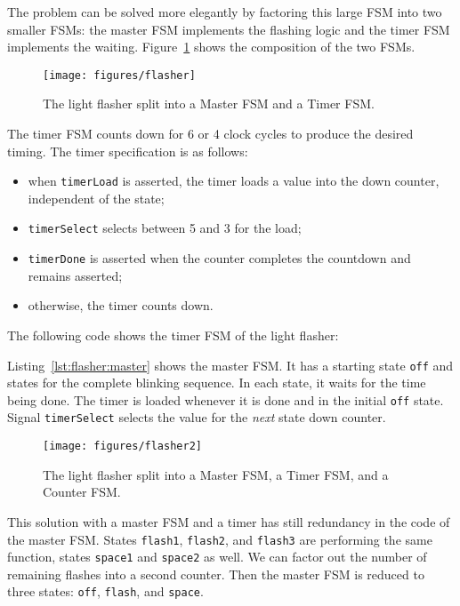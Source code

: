 \documentclass[%
    10pt,
    headinclude, footexclude,
    openright, %
    notitlepage,
    cleardoubleempty,
    headsepline,
    pointlessnumbers,
    bibtotoc, idxtotoc,
    ]{scrbook}
\newcommand{\scale}{0.7}
\newcommand{\code}[1]{{\lstinline[basicstyle=\small\ttfamily]{#1}}}
\begin{document}
The problem can be solved more elegantly by factoring this large FSM into
two smaller FSMs: the master FSM implements the flashing logic and the timer FSM
implements the waiting. Figure~\ref{fig:flasher} shows the composition of
the two FSMs.

\begin{figure}
  \centering
  \texttt{[image: figures/flasher]}
  \caption{The light flasher split into a Master FSM and a Timer FSM.}
  \label{fig:flasher}
\end{figure}

The timer FSM counts down for 6 or 4 clock cycles to produce the desired timing.
The timer specification is as follows:

\begin{itemize}
\item when \code{timerLoad} is asserted, the timer loads a value into the down counter,
independent of the state;
\item \code{timerSelect} selects between 5 and 3 for the load;
\item \code{timerDone} is asserted when the counter completes the countdown
and remains asserted;
\item otherwise, the timer counts down.
\end{itemize}

\noindent The following code shows the timer FSM of the light flasher:


\noindent Listing~\ref{lst:flasher:master} shows the master FSM. It has a starting
state \code{off} and states for the complete blinking sequence. In each state, it
waits for the time being done. The timer is loaded whenever it is done and in the
initial \code{off} state. Signal \code{timerSelect} selects the value for the \emph{next}
state down counter.


\begin{figure}
  \centering
  \texttt{[image: figures/flasher2]}
  \caption{The light flasher split into a Master FSM, a Timer FSM, and a Counter FSM.}
  \label{fig:flasher2}
\end{figure}

This solution with a master FSM and a timer has still redundancy in the code
of the master FSM. States \code{flash1}, \code{flash2}, and \code{flash3}
are performing the same function, states \code{space1} and \code{space2} as well.
We can factor out the number of remaining flashes into a second counter.
Then the master FSM is reduced to three states: \code{off}, \code{flash},
and \code{space}.
\end{document}
